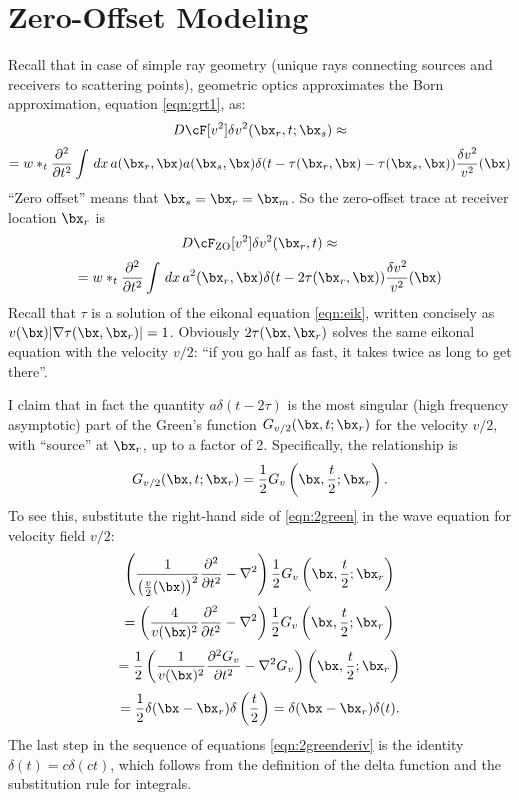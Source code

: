 \section{Zero-Offset Modeling}
Recall that in case of simple ray geometry (unique rays connecting sources and receivers to scattering points), geometric optics approximates the Born approximation, equation \ref{eqn:grt1}, as:
\[
D\cF[v^2]\delta v^2(\bx_r,t;\bx_s) \approx 
\]
\begin{equation}
\label{eqn:grt1r}
= w*_t \frac{\partial^2}{\partial t^2}\int \, dx \, a(\bx_r,\bx)a(\bx_s,\bx)\delta(t-\tau(\bx_r,\bx)-\tau(\bx_s,\bx)) \frac{\delta v^2}{v^2}(\bx)
\end{equation}
``Zero offset'' means that $\bx_s = \bx_r=\bx_m$. So the zero-offset trace at receiver location $\bx_r$ is
\[
D\cF_{\rm ZO}[v^2]\delta v^2(\bx_r,t) \approx 
\]
\begin{equation}
\label{eqn:grt1r1}
= w*_t \frac{\partial^2}{\partial t^2}\int \, dx \, a^2(\bx_r,\bx)\delta(t-2\tau(\bx_r,\bx)) \frac{\delta v^2}{v^2}(\bx) 
\end{equation}
Recall that $\tau$ is a solution of the eikonal equation \ref{eqn:eik}, written concisely as $v(\bx)|\nabla \tau(\bx,\bx_r)|=1$. Obviously $2\tau(\bx,\bx_r)$ solves the same eikonal equation with the velocity $ v/2$: ``if you go half as fast, it takes twice as long to get there''.

I claim that in fact the quantity $a \delta(t-2\tau)$ is the most singular (high frequency asymptotic) part of the Green's function $G_{v/2}(\bx,t;\bx_r)$ for the velocity $v/2$, with ``source'' at $\bx_r$, up to a factor of 2. Specifically, the relationship is
\begin{equation}
\label{eqn:2green}
G_{v/2}(\bx,t;\bx_r) = \frac{1}{2}G_v\left(\bx,\frac{t}{2};\bx_r\right).
\end{equation}
To see this, substitute the right-hand side of \ref{eqn:2green} in the wave equation for velocity field $v/2$:
\[
\left(\frac{1}{\left(\frac{v}{2}(\bx)\right)^2} \frac{\partial^2}{\partial t^2} - \nabla^2\right) \frac{1}{2}G_v\left(\bx,\frac{t}{2};\bx_r\right)
\]
\[
=\left(\frac{4}{v(\bx)^2}\frac{\partial^2}{\partial t^2} - \nabla^2\right)\frac{1}{2}G_v\left(\bx,\frac{t}{2};\bx_r\right)
\]
\[
= \frac{1}{2}\left(\frac{1}{v(\bx)^2}\frac{\partial^2G_v}{\partial t^2} - \nabla^2G_v\right)\left(\bx,\frac{t}{2};\bx_r\right)
\]
\begin{equation}
\label{eqn:2greenderiv}
=\frac{1}{2}\delta(\bx-\bx_r)\delta\left(\frac{t}{2}\right) = \delta(\bx-\bx_r)\delta(t).
\end{equation}
The last step in the sequence of equations \ref{eqn:2greenderiv} is the identity $\delta(t) = c\delta(ct)$, which follows from the definition of the delta function and the substitution rule for integrals.

